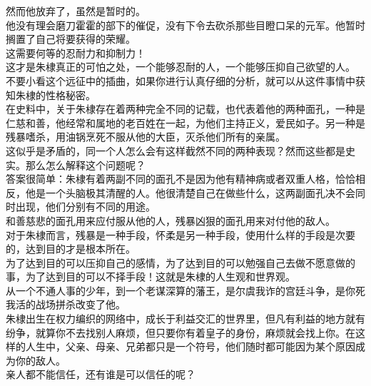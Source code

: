 \begin{multicols}{\theparacolNo}
然而他放弃了，虽然是暂时的。\\

他没有理会磨刀霍霍的部下的催促，没有下令去砍杀那些目瞪口呆的元军。他暂时搁置了自己将要获得的荣耀。\\

这需要何等的忍耐力和抑制力！\\

这才是朱棣真正的可怕之处，一个能够忍耐的人，一个能够压抑自己欲望的人。\\

不要小看这个远征中的插曲，如果你进行认真仔细的分析，就可以从这件事情中获知朱棣的性格秘密。\\

在史料中，关于朱棣存在着两种完全不同的记载，也代表着他的两种面孔，一种是仁慈和善，他经常和属地的老百姓在一起，为他们主持正义，爱民如子。另一种是残暴嗜杀，用油锅烹死不服从他的大臣，灭杀他们所有的亲属。\\

这似乎是矛盾的，同一个人怎么会有这样截然不同的两种表现？然而这些都是史实。那么怎么解释这个问题呢？\\

答案很简单：朱棣有着两副不同的面孔不是因为他有精神病或者双重人格，恰恰相反，他是一个头脑极其清醒的人。他很清楚自己在做些什么，这两副面孔决不会同时出现，他们分别有不同的用途。\\

和善慈悲的面孔用来应付服从他的人，残暴凶狠的面孔用来对付他的敌人。\\

对于朱棣而言，残暴是一种手段，怀柔是另一种手段，使用什么样的手段是次要的，达到目的才是根本所在。\\

为了达到目的可以压抑自己的感情，为了达到目的可以勉强自己去做不愿意做的事，为了达到目的可以不择手段！这就是朱棣的人生观和世界观。\\

从一个不通人事的少年，到一个老谋深算的藩王，是尔虞我诈的宫廷斗争，是你死我活的战场拼杀改变了他。\\

朱棣出生在权力编织的网络中，成长于利益交汇的世界里，但凡有利益的地方就有纷争，就算你不去找别人麻烦，但只要你有着皇子的身份，麻烦就会找上你。在这样的人生中，父亲、母亲、兄弟都只是一个符号，他们随时都可能因为某个原因成为你的敌人。\\

亲人都不能信任，还有谁是可以信任的呢？\\


\end{multicols}
